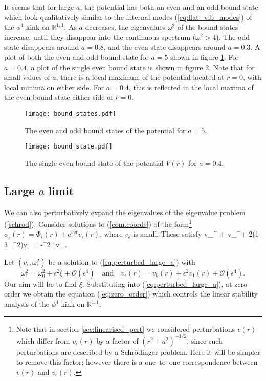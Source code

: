 It seems that for large $a$, the potential has both an even and an odd bound state which look qualitatively similar to the internal modes (\ref{eq:flat_vib_modes}) of the $\phi^4$ kink on $\mathbb{R}^{1,1}$. As $a$ decreases, the eigenvalues $\omega^2$ of the bound states increase, until they disappear into the continuous spectrum ($\omega^2>4$). The odd state disappears around $a=0.8$, and the even state disappears around $a=0.3$. A plot of both the even and odd bound state for $a=5$ shown in figure \ref{fig:bound_states}. For $a=0.4$, a plot of the single even bound state is shown in figure \ref{fig:bound_state}. Note that for small values of $a$, there is a  local maximum of the potential located at $r=0$, with local minima on either side. For $a=0.4$, this is reflected in the local maxima of the even bound state either side of $r=0$.

\begin{figure}
\texttt{[image: bound\_states.pdf]}
\caption{\label{fig:bound_states}The even and odd bound states of the potential for $a=5$.}
\end{figure}

\begin{figure}
\texttt{[image: bound\_state.pdf]}
\caption{\label{fig:bound_state}The single even bound state of the potential $V(r)$ for $a=0.4$.}
\end{figure}

\subsection{Large $a$ limit}

We can also perturbatively expand the eigenvalues of the eigenvalue problem (\ref{schrod}). Consider solutions to (\ref{eom.coords}) of the form\footnote{Note that in section \ref{sec:linearised_pert} we considered perturbations $v(r)$ which differ from $v_\epsilon(r)$ by a factor of $(r^2+a^2)^{-1/2}$, since such perturbations are described by a Schr\"odinger problem. Here it will be simpler to remove this factor; however there is a one--to--one correspondence between $v(r)$ and $v_\epsilon(r)$.} $\phi_\epsilon(r)=\Phi_\epsilon(r)+\mathrm{e}^{i\omega t}v_\epsilon(r)$, where $v_\epsilon$ is small.
These satisfy
\be
\label{eq:perturbed_large_a}
v_\epsilon^{\prime\prime} + v_\epsilon^\prime + 2(1-3\Phi_\epsilon^2)v_\epsilon = -\omega^2_\epsilon v_\epsilon.
\ee

Let $(v_\epsilon,\omega^2_\epsilon)$ be a solution to (\ref{eq:perturbed_large_a}) with
\[
\omega^2_\epsilon = \omega^2_0 + \epsilon^2\xi + \mathcal{O}(\epsilon^4) \quad \mathrm{and} \quad
v_\epsilon(r) = v_0(r) + \epsilon^2v_1(r) + \mathcal{O}(\epsilon^4).
\]
Our aim will be to find $\xi$. Substituting into (\ref{eq:perturbed_large_a}), at zero order we obtain the equation (\ref{eq:zero_order}) which controls the linear stability analysis of the $\phi^4$ kink on $\mathbb{R}^{1,1}$.


